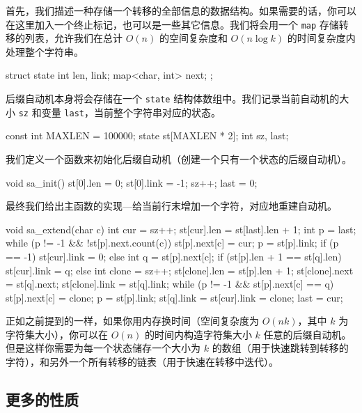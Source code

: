 首先，我们描述一种存储一个转移的全部信息的数据结构。如果需要的话，你可以在这里加入一个终止标记，也可以是一些其它信息。我们将会用一个 \texttt{map} 存储转移的列表，允许我们在总计 $O(n)$ 的空间复杂度和 $O(n\log k)$ 的时间复杂度内处理整个字符串。

\begin{cppcode}
struct state {
  int len, link;
  map<char, int> next;
};
\end{cppcode}

后缀自动机本身将会存储在一个 \texttt{state} 结构体数组中。我们记录当前自动机的大小 \texttt{sz} 和变量 \texttt{last}，当前整个字符串对应的状态。

\begin{cppcode}
const int MAXLEN = 100000;
state st[MAXLEN * 2];
int sz, last;
\end{cppcode}

我们定义一个函数来初始化后缀自动机（创建一个只有一个状态的后缀自动机）。

\begin{cppcode}
void sa_init() {
  st[0].len = 0;
  st[0].link = -1;
  sz++;
  last = 0;
}
\end{cppcode}

最终我们给出主函数的实现—给当前行末增加一个字符，对应地重建自动机。

\begin{cppcode}
void sa_extend(char c) {
  int cur = sz++;
  st[cur].len = st[last].len + 1;
  int p = last;
  while (p != -1 && !st[p].next.count(c)) {
    st[p].next[c] = cur;
    p = st[p].link;
  }
  if (p == -1) {
    st[cur].link = 0;
  } else {
    int q = st[p].next[c];
    if (st[p].len + 1 == st[q].len) {
      st[cur].link = q;
    } else {
      int clone = sz++;
      st[clone].len = st[p].len + 1;
      st[clone].next = st[q].next;
      st[clone].link = st[q].link;
      while (p != -1 && st[p].next[c] == q) {
        st[p].next[c] = clone;
        p = st[p].link;
      }
      st[q].link = st[cur].link = clone;
    }
  }
  last = cur;
}
\end{cppcode}

正如之前提到的一样，如果你用内存换时间（空间复杂度为 $O(nk)$，其中 $k$ 为字符集大小），你可以在 $O(n)$ 的时间内构造字符集大小 $k$ 任意的后缀自动机。但是这样你需要为每一个状态储存一个大小为 $k$ 的数组（用于快速跳转到转移的字符），和另外一个所有转移的链表（用于快速在转移中迭代）。

\subsection{更多的性质}

